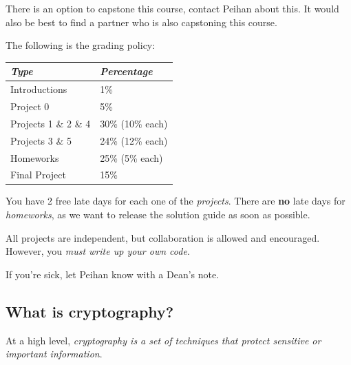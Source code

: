 There is an option to capstone this course, contact Peihan about this. It would also be best to find a partner who is also capstoning this course.

The following is the grading policy:
\begin{center}
    \begin{tabular}{@{}ll@{}}
        \toprule
        \textit{Type}           & \textit{Percentage} \\ \midrule
        Introductions           & 1\%                 \\
        Project 0               & 5\%                 \\
        Projects 1 \& 2 \& 4    & 30\% (10\% each)    \\
        Projects 3 \& 5         & 24\% (12\% each)    \\
        Homeworks               & 25\% (5\% each)     \\
        Final Project           & 15\%                \\ \bottomrule
    \end{tabular}
\end{center}

You have 2 free late days for each one of the \emph{projects}. There are \textbf{no} late days for \emph{homeworks}, as we want to release the solution guide as soon as possible.

All projects are independent, but collaboration is allowed and encouraged. However, you \emph{must write up your own code}.

If you're sick, let Peihan know with a Dean's note.

\subsection{What is cryptography?}

At a high level, \emph{cryptography is a set of techniques that protect sensitive or important information}.

